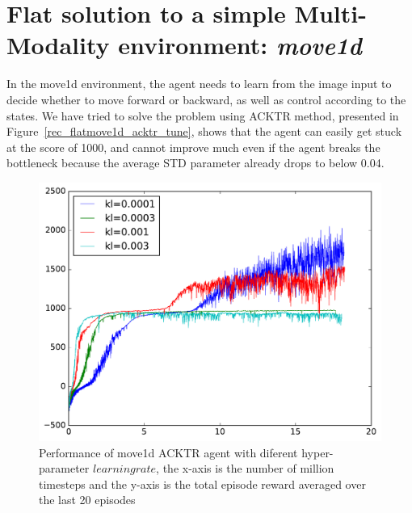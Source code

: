 \section{Flat solution to a simple Multi-Modality environment: \textit{move1d}}
In the move1d environment, the agent needs to learn from the image input to decide whether to move forward or backward, as well as control according to the states.
We have tried to solve the problem using ACKTR method, presented in Figure~\ref{rec_flatmove1d_acktr_tune}, shows that the agent can easily get stuck at the score of 1000, and cannot improve much even if the agent breaks the bottleneck because the average STD parameter already drops to below 0.04.
\begin{figure}[h]
\includegraphics[width=\textwidth]{images/rec_flatmove1d_acktr_tune.pdf}
\centering
\caption{Performance of move1d ACKTR agent with diferent hyper-parameter $learning rate$, the x-axis is the number of million timesteps and the y-axis is the total episode reward averaged over the last 20 episodes}
\end{figure}\label{rec_flatmove1d_acktr_tune}

